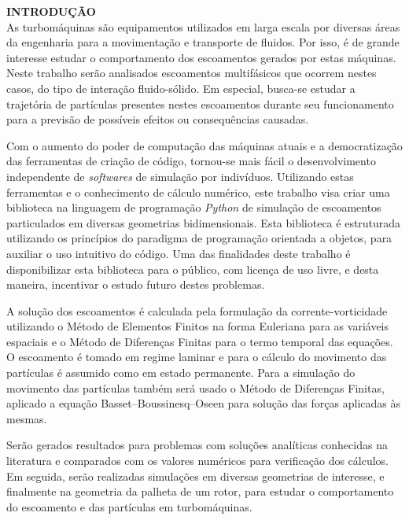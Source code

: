 \noindent\textbf{INTRODUÇÃO}
\\

As turbomáquinas são equipamentos utilizados em larga escala por diversas áreas da engenharia para a movimentação e transporte de fluidos.
Por isso, é de grande interesse estudar o comportamento dos escoamentos gerados por estas máquinas.
Neste trabalho serão analisados escoamentos multifásicos que ocorrem nestes casos, do tipo de interação fluido-sólido.
Em especial, busca-se estudar a trajetória de partículas presentes nestes escoamentos durante seu funcionamento para a previsão de possíveis efeitos ou consequências causadas.

Com o aumento do poder de computação das máquinas atuais e a democratização das ferramentas de criação de código, tornou-se mais fácil o desenvolvimento independente de \textit{softwares} de simulação por indivíduos.
Utilizando estas ferramentas e o conhecimento de cálculo numérico, este trabalho visa criar uma biblioteca na linguagem de programação \textit{Python} de simulação de escoamentos particulados em diversas geometrias bidimensionais.
Esta biblioteca é estruturada utilizando os princípios do paradigma de programação orientada a objetos, para auxiliar o uso intuitivo do código.
Uma das finalidades deste trabalho é disponibilizar esta biblioteca para o público, com licença de uso livre, e desta maneira, incentivar o estudo futuro destes problemas.

A solução dos escoamentos é calculada pela formulação da corrente-vorticidade utilizando o Método de Elementos Finitos na forma Euleriana para as variáveis espaciais e o Método de Diferenças Finitas para o termo temporal das equações.
O escoamento é tomado em regime laminar e para o cálculo do movimento das partículas é assumido como em estado permanente.
Para a simulação do movimento das partículas também será usado o Método de Diferenças Finitas, aplicado a equação Basset–Boussinesq–Oseen para solução das forças aplicadas às mesmas.

Serão gerados resultados para problemas com soluções analíticas conhecidas na literatura e comparados com os valores numéricos para verificação dos cálculos.
Em seguida, serão realizadas simulações em diversas geometrias de interesse, e finalmente na geometria da palheta de um rotor, para estudar o comportamento do escoamento e das partículas em turbomáquinas.


